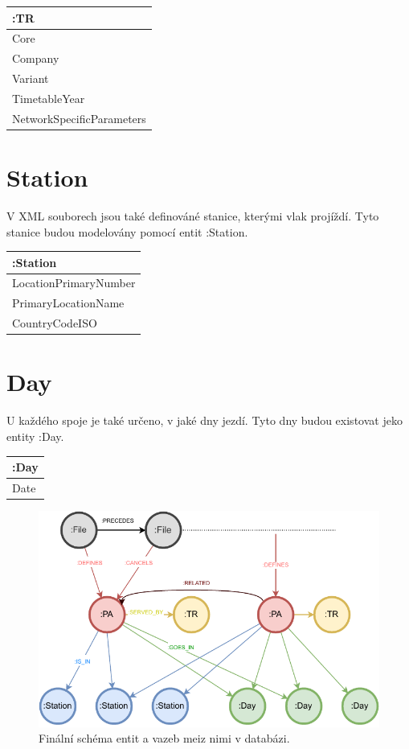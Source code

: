 \documentclass[10pt,xcolor=pdflatex,dvipsnames,table,oneside]{book}
\begin{document}
\vspace{1em}
\begin{tabular}{|l|}
    \hline
    :TR \\
    \hline
    Core \\
    Company \\
    Variant \\
    TimetableYear \\
    NetworkSpecificParameters \\
    \hline
\end{tabular}

\section{Station}
V XML souborech jsou také definováné stanice, kterými vlak projíždí. Tyto stanice budou modelovány pomocí
entit :Station.

\vspace{1em}
\begin{tabular}{|l|}
    \hline
    :Station \\
    \hline
    LocationPrimaryNumber \\
    PrimaryLocationName \\
    CountryCodeISO \\
    \hline
\end{tabular}

\section{Day}
U každého spoje je také určeno, v jaké dny jezdí. Tyto dny budou existovat jeko entity :Day.

\vspace{1em}
\begin{tabular}{|l|}
    \hline
    :Day \\
    \hline
    Date \\
    \hline
\end{tabular}

\begin{figure}
    \includegraphics[width=1\textwidth, angle=0]{img/structure.pdf}
    \caption{Finální schéma entit a vazeb meiz nimi v databázi.}
\end{figure}
\end{document}
